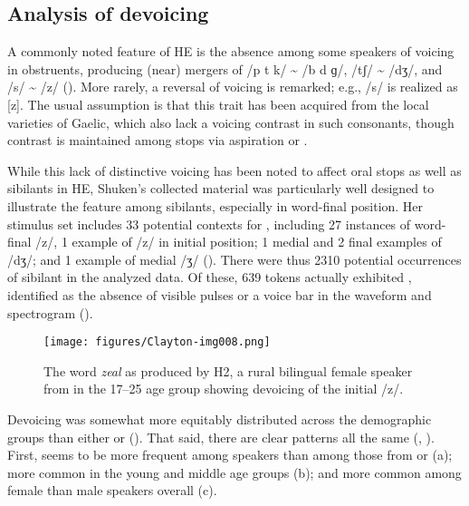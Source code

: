 \documentclass[output=paper,colorlinks,citecolor=brown]{langscibook}
\begin{document}
\subsection{Analysis of devoicing}

A commonly noted feature of HE is the absence among some speakers of voicing in obstruents, producing (near) mergers of /p t k/ {\textasciitilde} /b d ɡ/, /tʃ/ {\textasciitilde} /dʒ/, and /s/ {\textasciitilde} /z/ (\citealt{Wells:1982, Shuken:1984, Jones:2002, Stuart-Smith:2008}). More rarely, a reversal of voicing is remarked; e.g., /s/ is realized as [z]. The usual assumption is that this trait has been acquired from the local varieties of Gaelic, which also lack a voicing contrast in such consonants, though contrast is maintained among stops via aspiration or . 

While this lack of distinctive voicing has been noted to affect oral stops as well as sibilants in HE, Shuken’s collected material was particularly well designed to illustrate the feature among sibilants, especially in word-final position. Her stimulus set includes 33 potential contexts for , including 27 instances of word-final /z/, 1 example of /z/ in initial position; 1 medial and 2 final examples of /dʒ/; and 1 example of medial /ʒ/ (). There were thus 2310 potential occurrences of sibilant  in the analyzed data. Of these, 639 tokens actually exhibited , identified as the absence of visible pulses or a voice bar in the waveform and spectrogram (). 

\begin{figure}
\texttt{[image: figures/Clayton-img008.png]}
\caption{The word \textit{zeal} as produced by H2, a rural bilingual female speaker from  in the 17--25 age group showing devoicing of the initial /z/.}
\label{fig:8}
\end{figure}

Devoicing was somewhat more equitably distributed across the demographic groups than either  or  (). That said, there are clear patterns all the same (, ). First,  seems to be more frequent among  speakers than among those from  or  (a); more common in the young and middle age groups (b); and more common among female than male speakers overall (c). 
\end{document}
